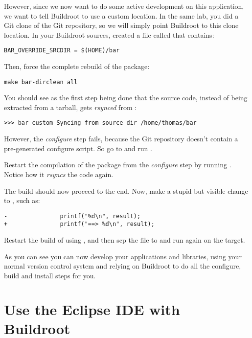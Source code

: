 However, since we now want to do some active development on this
application, we want to tell Buildroot to use a custom location. In
the same lab, you did a Git clone of the  Git repository, so
we will simply point Buildroot to this clone location. In your
Buildroot sources, created a file called  that
contains:

\begin{verbatim}
BAR_OVERRIDE_SRCDIR = $(HOME)/bar
\end{verbatim}

Then, force the complete rebuild of the  package:

\begin{verbatim}
make bar-dirclean all
\end{verbatim}

You should see as the first step being done that the  source
code, instead of being extracted from a tarball, gets {\em rsynced}
from :

\begin{verbatim}
>>> bar custom Syncing from source dir /home/thomas/bar
\end{verbatim}

However, the {\em configure} step fails, because the Git repository
doesn't contain a pre-generated configure script. So go to
 and run .

Restart the compilation of the  package from the {\em
  configure} step by running . Notice how
it {\em rsyncs} the code again.

The build should now proceed to the end. Now, make a stupid but
visible change to , such as:

\begin{verbatim}
-               printf("%d\n", result);
+               printf("==> %d\n", result);
\end{verbatim}

Restart the build of  using , and
then scp the file  to
 and run  again on the target.

As you can see you can now develop your applications and libraries,
using your normal version control system and relying on Buildroot to
do all the configure, build and install steps for you.

\section{Use the Eclipse IDE with Buildroot}
